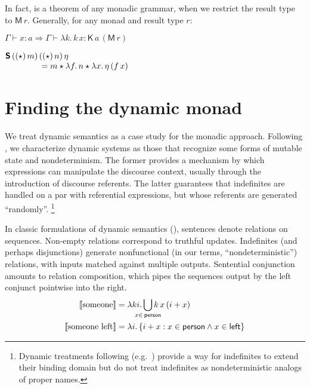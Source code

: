  In fact,  is a theorem of any monadic grammar, when we restrict the result type to $\textsf{M}\,r$. Generally, for any monad  and result type $r$:%
	\begin{fact}%
    $\Gamma \vdash x : a \Rightarrow \Gamma \vdash \lambda k.\,k\,x : \textsf{K}\,a\,(\textsf{M}\,r)$%
	\end{fact}
	\begin{fact}%
		$\begin{array}[t]{@{}r@{}l@{}}
			\bsf{S}\,((\star)\,m)\,&((\star)\,n)\,\eta 
			\\
			&{}= m \star \lambda f.\,n \star \lambda x.\,\eta\,(f\,x)%
			\\
		\end{array}$%
	\end{fact}

\section{Finding the dynamic monad}
  We treat dynamic semantics as a case study for the monadic approach. Following \citet{Shan:2001}, we characterize dynamic systems as those that recognize some forms of mutable state and nondeterminism. The former provides a mechanism by which expressions can manipulate the discourse context, usually through the introduction of discourse referents. The latter guarantees that indefinites are handled on a par with referential expressions, but whose referents are generated ``randomly''.%
  \footnote{Dynamic treatments following \citealt{GroenendijkStokhof:1990} (e.g.~\citealt{Zimmermann:1991, Dekker:1993, Szabolcsi:2003, Groote:2006}) provide a way for indefinites to extend their binding domain but do not treat indefinites as nondeterministic analogs of proper names.}%
	
  In classic formulations of dynamic semantics (\citealt{Heim:1982, Kamp:1981, GroenendijkStokhof:1991, Dekker:1994}), sentences denote relations on sequences. Non-empty relations correspond to truthful updates. Indefinites (and perhaps disjunctions) generate nonfunctional (in our terms, ``nondeterministic'') relations, with inputs matched against multiple outputs. Sentential conjunction amounts to relation composition, which pipes the sequences output by the left conjunct pointwise into the right.%
  \begin{align}%
    \label{eq:classic-indef}%
		\sv{\text{someone}} &= \lambda ki.\displaystyle\bigcup_{\mathclap{x\in\,\textsf{person}}}k\,x\,(i + x)%
		\\
		\sv{\text{someone left}} &= \lambda i.\,\{i + x : x \in \textsf{person} \wedge x \in \textsf{left}\}%
    \notag
  \end{align}%

